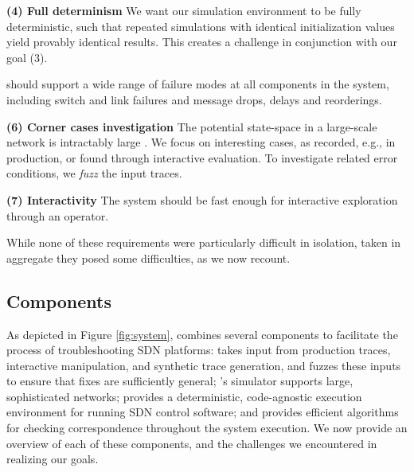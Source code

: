 {\noindent \textbf{(4) Full determinism} We want our simulation environment to be fully
deterministic, such that repeated simulations with identical initialization values
yield provably identical results. This creates a challenge in conjunction with our goal (3).

 \projectname{} should
support a wide range of failure modes at all components in the
system, including switch and link failures and message drops, delays and reorderings.

\noindent\textbf{(6) Corner cases investigation} The potential state-space in a large-scale network
is intractably large .  We focus on interesting cases, as recorded, e.g., in production, or
found through interactive evaluation. To investigate related error conditions,
we \emph{fuzz} the input traces.

\noindent\textbf{(7) Interactivity} The system should be fast enough for interactive exploration through
an operator.

\medskip

While none of these requirements were particularly difficult in isolation, taken in aggregate they posed some difficulties, as we now recount.

\subsection{Components}

As depicted in Figure \ref{fig:system}, \projectname{} combines several
components to facilitate the process of troubleshooting SDN platforms:
\projectname{} takes input
from production traces, interactive manipulation, and synthetic trace
generation, and fuzzes these inputs to ensure that fixes are sufficiently general;
\projectname{}'s simulator supports large, sophisticated networks;
\projectname{} provides a deterministic, code-agnostic execution environment
for running SDN control software; and provides efficient algorithms for
checking correspondence throughout the system execution. We now provide an
overview of each of these components, and the challenges we encountered in
realizing our goals.

}
